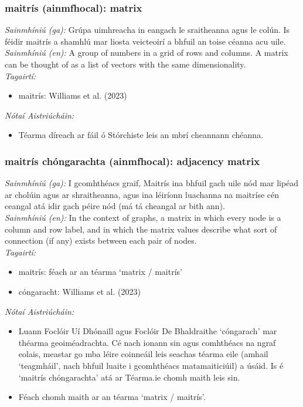 \subsubsection*{maitrís (ainmfhocal): matrix}
 \noindent \textit{Sainmhíniú (ga):} Grúpa uimhreacha in eangach le sraitheanna agus le colún. Is féidir maitrís a shamhlú mar liosta veicteoirí a bhfuil an toise céanna acu uile.
\\
 \noindent \textit{Sainmhíniú (en):} A group of numbers in a grid of rows and columns. A matrix can be thought of as a list of vectors with the same dimensionality.
\\
 \noindent \textit{Tagairtí:}
\begin{itemize}
	\item maitrís: Williams et al. (2023) \cite{storchiste}
\end{itemize}

 \noindent \textit{Nótaí Aistriúcháin:}
\begin{itemize}
	\item Téarma díreach ar fáil ó Stórchiste leis an mbrí cheannann chéanna.
\end{itemize}


\subsubsection*{maitrís chóngarachta (ainmfhocal): adjacency matrix}
 \noindent \textit{Sainmhíniú (ga):} I gcomhthéacs graif, Maitrís ina bhfuil gach uile nód mar lipéad ar cholúin agus ar shraitheanna, agus ina léiríonn luachanna na maitríse cén ceangal atá idir gach péire nód (má tá cheangal ar bith ann).
\\
 \noindent \textit{Sainmhíniú (en):} In the context of graphs, a matrix in which every node is a column and row label, and in which the matrix values describe what sort of connection (if any) exists between each pair of nodes. 
\\
 \noindent \textit{Tagairtí:}
\begin{itemize}
	\item maitrís: féach ar an téarma `matrix / maitrís'
	\item cóngaracht: Williams et al. (2023) \cite{storchiste}
\end{itemize}

 \noindent \textit{Nótaí Aistriúcháin:}
\begin{itemize}
	\item Luann Foclóir Uí Dhónaill agus Foclóir De Bhaldraithe `cóngarach' mar théarma geoiméadrachta. Cé nach ionann sin agus comhthéacs na ngraf eolais, meastar go mba léire coinneáil leis seachas téarma eile (amhail `teagmháil', nach bhfuil luaite i gcomhthéacs matamaiticiúil) a úsáid. Is é `maitrís chóngarachta' atá ar Téarma.ie chomh maith leis sin.
	\item Féach chomh maith ar an téarma `matrix / maitrís'.
\end{itemize}



